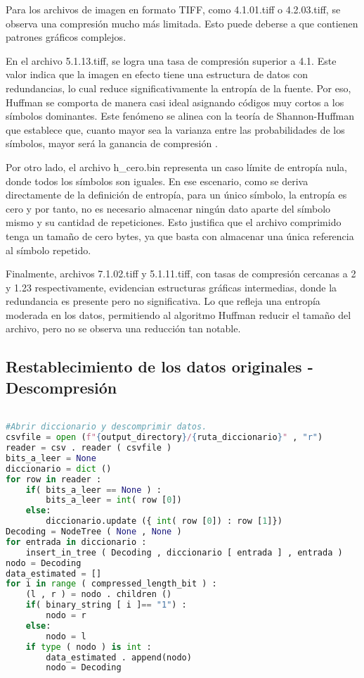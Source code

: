 \documentclass[conference,onecolumn,12pt]{IEEEtran}
\numberwithin{equation}{subsection}
\begin{document}
Para los archivos de imagen en formato TIFF, como 4.1.01.tiff o 4.2.03.tiff, se observa una compresión mucho más limitada. Esto puede deberse a que contienen patrones gráficos complejos.

En el archivo 5.1.13.tiff, se logra una tasa de compresión superior a 4.1. Este valor indica que la imagen en efecto tiene una estructura de datos con redundancias, lo cual reduce significativamente la entropía de la fuente. Por eso, Huffman se comporta de manera casi ideal asignando códigos muy cortos a los símbolos dominantes. Este fenómeno se alinea con la teoría de Shannon-Huffman que establece que, cuanto mayor sea la varianza entre las probabilidades de los símbolos, mayor será la ganancia de compresión \cite{haykin}.

Por otro lado, el archivo h\_cero.bin representa un caso límite de entropía nula, donde todos los símbolos son iguales. En ese escenario, como se deriva directamente de la definición de entropía, para un único símbolo, la entropía es cero y por tanto, no es necesario almacenar ningún dato aparte del símbolo mismo y su cantidad de repeticiones. Esto justifica que el archivo comprimido tenga un tamaño de cero bytes, ya que basta con almacenar una única referencia al símbolo repetido. 

Finalmente, archivos 7.1.02.tiff y 5.1.11.tiff, con tasas de compresión cercanas a 2 y 1.23 respectivamente, evidencian estructuras gráficas intermedias, donde la redundancia es presente pero no significativa. Lo que refleja una entropía moderada en los datos, permitiendo al algoritmo Huffman reducir el tamaño del archivo, pero no se observa una reducción tan notable.






\newpage


\subsection{Restablecimiento de los datos originales - Descompresión}

\begin{lstlisting}[language=Python, caption={Código modificado para guardar los datos en una carpeta de destino}, label={listing3}]

#Abrir diccionario y descomprimir datos.
csvfile = open (f"{output_directory}/{ruta_diccionario}" , "r")
reader = csv . reader ( csvfile )
bits_a_leer = None 
diccionario = dict () 
for row in reader :
    if( bits_a_leer == None ) :
        bits_a_leer = int( row [0]) 
    else:
        diccionario.update ({ int( row [0]) : row [1]})
Decoding = NodeTree ( None , None ) 
for entrada in diccionario :
    insert_in_tree ( Decoding , diccionario [ entrada ] , entrada )
nodo = Decoding 
data_estimated = []
for i in range ( compressed_length_bit ) :
    (l , r ) = nodo . children () 
    if( binary_string [ i ]== "1") :
        nodo = r
    else:
        nodo = l
    if type ( nodo ) is int :
        data_estimated . append(nodo)
        nodo = Decoding


\end{lstlisting}
\end{document}
